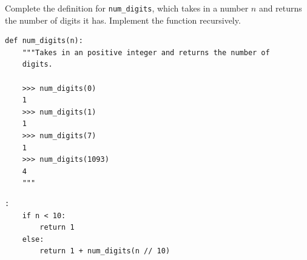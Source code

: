 \begin{blocksection}
\question Complete the definition for \texttt{num\_digits}, which takes in a number $n$ and returns the number of digits it has. Implement the function recursively.

\begin{lstlisting}
def num_digits(n):
    """Takes in an positive integer and returns the number of
    digits.

    >>> num_digits(0)
    1
    >>> num_digits(1)
    1
    >>> num_digits(7)
    1
    >>> num_digits(1093)
    4
    """
\end{lstlisting}

\begin{solution}[1in]
\begin{lstlisting}:
    if n < 10:
        return 1
    else:
        return 1 + num_digits(n // 10)
\end{lstlisting}
\end{solution}
\end{blocksection}
